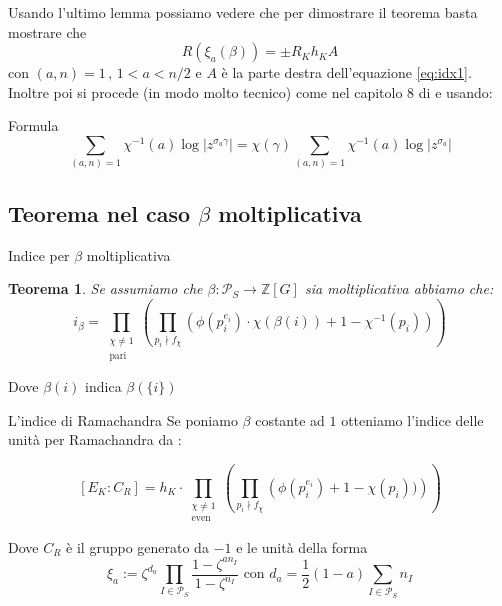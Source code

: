 \documentclass[handout]{beamer}
\theoremstyle{plain}
\newtheorem{teo}{Teorema}[section]
\theoremstyle{remark}
\theoremstyle{definition}
\newcommand{\PS}{\mathcal{P}_S}
\newcommand{\Z}{\mathbb{Z}}
\begin{document}
	\begin{frame}
		Usando l'ultimo lemma possiamo vedere che per dimostrare il teorema basta mostrare che 
		$$ R(\xi_a(\beta)) = \pm R_K h_K A $$
		con $ (a,n)=1 \, , \,1 < a <n/2 $ e $ A$ è la parte destra dell'equazione \ref{eq:idx1}.\pause \\
	
		Inoltre poi si procede (in modo molto tecnico) come nel capitolo 8 di \cite{CF} e usando:
		\begin{exampleblock}{Formula}
					\begin{equation} \label{eq:fact}
						\sum_{(a,n)=1} \chi ^{-1} (a) \log | z ^{\sigma_a \gamma }| = \chi (\gamma) \sum_{(a,n)=1} \chi ^{-1}(a) \log | z ^{\sigma_a  }|
					\end{equation}
		\end{exampleblock}
	\end{frame}

\subsection{Teorema nel caso $\beta$ moltiplicativa}	
	\begin{frame}{Indice per $\beta$ moltiplicativa}
			\begin{teo}
				\label{teo:idx_m}
				Se assumiamo che $ \beta : \PS \to \Z[G] $ sia moltiplicativa abbiamo che:
				\begin{equation}\label{eq:idx_m}
					i_\beta =  \prod_{ \substack{\chi \neq 1 \\ \text{pari}}} \left( \prod_{p_i \nmid f_\chi} \left( \phi (p_i^{e_i}) \cdot \chi (\beta (i))  + 1- \chi^{-1} (p_i)\right)  \right) 
				\end{equation}
			\end{teo}
			Dove $ \beta(i) $ indica $ \beta (\{i\})$
	\end{frame}
	
	\begin{frame}{L'indice di Ramachandra}
		Se poniamo $\beta$ costante ad $ 1 $ otteniamo l'indice delle unità per Ramachandra da \cite{RAM}:
			\begin{alertblock}{}
			\begin{equation}\label{eq:idx_ram}
				[E_K : C_R ] = h_K \cdot  \prod_{ \substack{\chi \neq 1 \\ \text{even}}} \left( \prod_{p_i \nmid f_\chi} \left( \phi (p_i^{e_i})  + 1- \chi (p_i))\right)  \right) 
			\end{equation}
			\end{alertblock}
			Dove $ C_R $ è il gruppo generato da $ -1 $ e le unità della forma
			\[ \xi_a := \zeta ^{d_a } \prod _{I \in \PS} \frac{ 1 - \zeta^{an_I}}{ 1 - \zeta^{n_I}}  \text{ con } d_a =\frac{1}{2}(1-a) \sum_{I \in \PS} n_I\]
	\end{frame}
	
\end{document}
